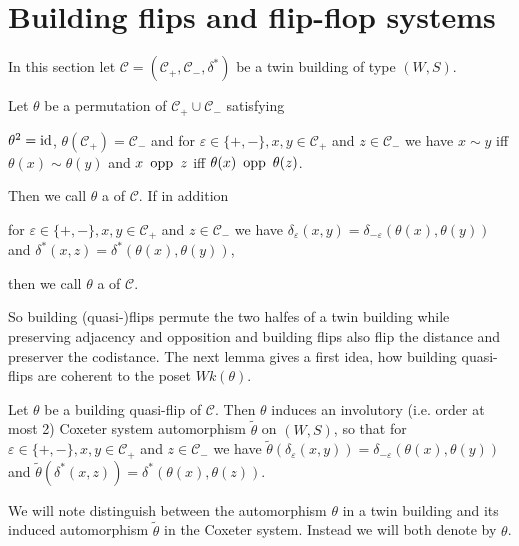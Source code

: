\section{Building flips and flip-flop systems}
In this section let $\mathcal C = (\mathcal C_+, \mathcal C_-, \delta^*)$ be a twin building of type $(W,S)$.

\begin{defi}
	Let $\theta$ be a permutation of $\mathcal C_+ \cup \mathcal C_-$ satisfying
	\begin{axioms}
		 $\theta^2 = \operatorname{id}$,
		 $\theta(\mathcal C_+) = \mathcal C_-$ and
		 for $\varepsilon \in \{+,-\}, x,y \in \mathcal C_+$ and $z \in \mathcal C_-$ we have $x \sim y$ iff $\theta(x) \sim \theta(y)$ and $x \opp z$ iff $\theta(x) \opp \theta(z)$.
	\end{axioms}
	Then we call $\theta$ a  of $\mathcal{C}$. If in addition
	\begin{axioms}
		 for $\varepsilon \in \{+,-\}, x,y \in \mathcal C_+$ and $z \in \mathcal C_-$ we have $\delta_\varepsilon(x,y) = \delta_{-\varepsilon}(\theta(x),\theta(y))$ and $\delta^*(x,z) = \delta^*(\theta(x),\theta(y))$, 
	\end{axioms}
	then we call $\theta$ a  of $\mathcal C$.
\end{defi}

So building (quasi-)flips permute the two halfes of a twin building while preserving adjacency and opposition and building flips also flip the distance and preserver the codistance. The next lemma gives a first idea, how building quasi-flips are coherent to the poset $Wk(\theta)$.

\begin{lemm}
	Let $\theta$ be a building quasi-flip of $\mathcal C$. Then $\theta$ induces an involutory (i.e. order at most 2) Coxeter system automorphism $\tilde \theta$ on $(W,S)$, so that for $\varepsilon \in \{+,-\}, x,y \in \mathcal C_+$ and $z \in \mathcal C_-$ we have $\tilde \theta(\delta_\varepsilon(x,y)) = \delta_{-\varepsilon}(\theta(x), \theta(y))$ and $\tilde \theta(\delta^*(x,z)) = \delta^*(\theta(x), \theta(z))$.
\end{lemm}

\begin{rema}
	We will note distinguish between the automorphism $\theta$ in a twin building and its induced automorphism $\tilde \theta$ in the Coxeter system. Instead we will both denote by $\theta$.
\end{rema}

